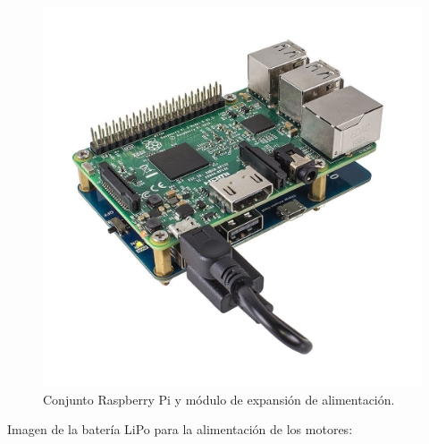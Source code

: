 \begin{figure}[H]
  \begin{center}
    \includegraphics[scale=0.15]{imagenes/modulo-expansion-rpi.jpg}
  \end{center}
  \caption{Conjunto Raspberry Pi y módulo de expansión de alimentación.}
  \label{figura:rpi-modulo-bateria}
\end{figure}


Imagen de la batería LiPo para la alimentación de los motores:


